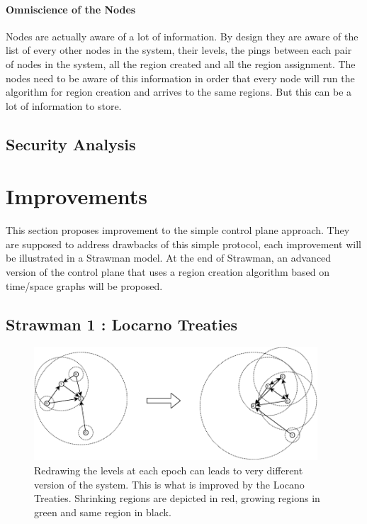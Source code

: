 \documentclass[a4paper,11pt,oneside]{report}
\begin{document}
 
\subsubsection{Omniscience of the Nodes}
Nodes are actually aware of a lot of information. By design they are aware of
the list of every other nodes in the system, their levels, the pings between
each pair of nodes in the system, all the region created and all the region
assignment. The nodes need to be aware of this information in order that
every node will run the algorithm for region creation and arrives to the same
regions. But this can be a lot of information to store.

\section{Security Analysis}


\chapter{Improvements}
This section proposes improvement to the simple control plane approach. They
are supposed to address drawbacks of this simple protocol, each improvement
will be illustrated in a Strawman model. At the end of Strawman, an advanced
version of the control plane that uses a region creation algorithm based on
time/space graphs will be proposed. 

\section{Strawman 1 : Locarno Treaties} \label{Locarno}

\begin{figure}[!h] 
\centering
\includegraphics[width=300pt]{figures/LocarnoTreaties-Redrawing}
\caption{Redrawing the levels at each epoch can leads to very different version
    of the system. This is what is improved by the Locano Treaties. Shrinking
    regions are depicted in red, growing regions in green and same region in
    black.} \label{fig:LocarnoTreaties-Redrawing}
\end{figure}
\end{document}
